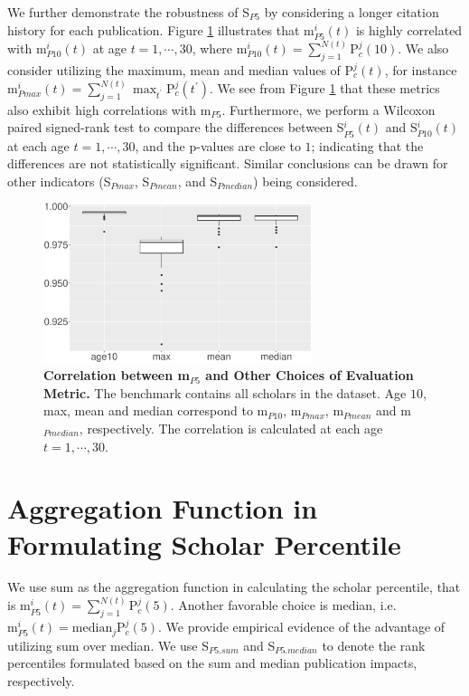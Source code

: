 \begin{refsection}
We further demonstrate the robustness of S$_{P5}$ by considering a longer citation history for each publication. Figure \ref{fig:robustness_test_cor} illustrates that m$_{P5}^{i}(t)$ is highly correlated with m$_{P10}^{i}(t)$ at age $t=1,\cdots,30$, where m$_{P10}^{i}(t)= \sum_{j=1}^{N(t)} \text{P}_{c}^{j}(10)$. We also consider utilizing the maximum, mean and median values of P$_{c}^{j}(t)$, for instance m$_{Pmax}^{i}(t)= \sum_{j=1}^{N(t)} \max_{t^\prime}\text{P}_{c}^{j}(t^\prime)$. We see from Figure \ref{fig:robustness_test_cor} that these metrics also exhibit high correlations with m$_{P5}$. Furthermore, we perform a Wilcoxon paired signed-rank test to compare the differences between S$_{P5}^{i}(t)$ and S$_{P10}^{i}(t)$ at each age $t=1,\cdots,30$, and the p-values are close to $1$; indicating that the differences are not statistically significant. Similar conclusions can be drawn for other indicators (S$_{Pmax}$, S$_{Pmean}$, and S$_{Pmedian}$) being considered.



\begin{figure}[ht!]
    \centering
    \includegraphics[width=0.7\textwidth]{figures/robustness/cor.eps}
    \caption{{\bf Correlation between m$_{P5}$ and Other Choices of Evaluation Metric.}
    The benchmark contains all scholars in the dataset. Age $10$, max, mean and median correspond to m$_{P10}$, m$_{Pmax}$, m$_{Pmean}$ and m$_{Pmedian}$, respectively. The correlation is calculated at each age $t=1,\cdots,30$.}
    \label{fig:robustness_test_cor}
\end{figure}


\section{Aggregation Function in Formulating Scholar Percentile}
\label{sec:suppl_aggfun}

We use sum as the aggregation function in calculating the scholar percentile, that is $\text{m}_{P5}^{i}(t)= \sum_{j=1}^{N(t)} \text{P}_{c}^{j}(5)$. Another favorable choice is median, i.e. $\text{m}_{P5}^{i}(t) = \text{median}_{j}\text{P}_{c}^{j}(5)$. We provide empirical evidence of the advantage of utilizing sum over median. We use S$_{P5.sum}$ and S$_{P5.median}$ to denote the rank percentiles formulated based on the sum and median publication impacts, respectively.


\end{refsection}
